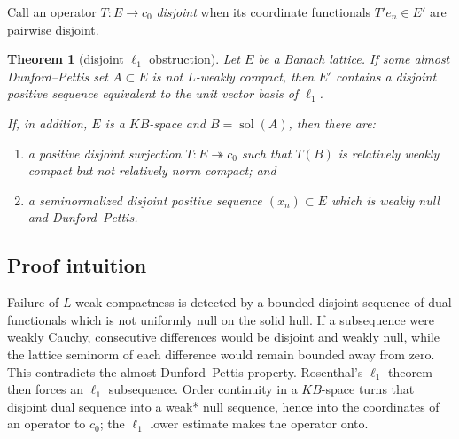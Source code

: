 \documentclass[11pt]{article}
\newtheorem{theorem}{Theorem}
\theoremstyle{remark}
\newcommand{\solh}{\operatorname{sol}}
\begin{document}
Call an operator $T:E\to c_0$ \emph{disjoint} when its coordinate
functionals $T'e_n\in E'$ are pairwise disjoint.

\begin{theorem}[disjoint $\ell_1$ obstruction]\label{thm:main}
Let $E$ be a Banach lattice.  If some almost Dunford--Pettis set
$A\subset E$ is not $L$-weakly compact, then $E'$ contains a disjoint
positive sequence equivalent to the unit vector basis of $\ell_1$.

If, in addition, $E$ is a $KB$-space and $B=\solh(A)$, then there are:
\begin{enumerate}[label=\textup{(\roman*)}]
\item a positive disjoint surjection $T:E\twoheadrightarrow c_0$ such that
$T(B)$ is relatively weakly compact but not relatively norm compact; and
\item a seminormalized disjoint positive sequence $(x_n)\subset E$ which is
weakly null and Dunford--Pettis.
\end{enumerate}
\end{theorem}

\subsection*{Proof intuition}

Failure of $L$-weak compactness is detected by a bounded disjoint sequence
of dual functionals which is not uniformly null on the solid hull.  If a
subsequence were weakly Cauchy, consecutive differences would be disjoint
and weakly null, while the lattice seminorm of each difference would remain
bounded away from zero.  This contradicts the almost Dunford--Pettis
property.  Rosenthal's $\ell_1$ theorem then forces an $\ell_1$ subsequence.
Order continuity in a $KB$-space turns that disjoint dual sequence into a
weak* null sequence, hence into the coordinates of an operator to $c_0$;
the $\ell_1$ lower estimate makes the operator onto.
\end{document}
